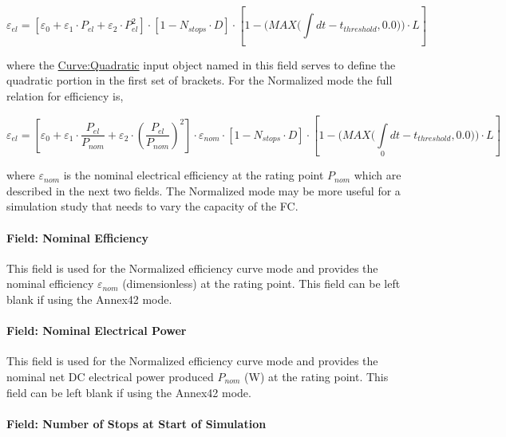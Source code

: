\begin{equation}
{\varepsilon_{el}} = \left[ {{\varepsilon_0} + {\varepsilon_1} \cdot {P_{el}} + {\varepsilon_2} \cdot P_{el}^2} \right] \cdot \left[ {1 - {N_{stops}} \cdot D} \right] \cdot \left[ {1 - (MAX(\int\limits_{} {dt - {t_{threshold}},0.0))}  \cdot L} \right]
\end{equation}

where the \hyperref[curvequadratic]{Curve:Quadratic} input object named in this field serves to define the quadratic portion in the first set of brackets. For the Normalized mode the full relation for efficiency is,

\begin{equation}
{\varepsilon_{el}} = \left[ {{\varepsilon_0} + {\varepsilon_1} \cdot \frac{{{P_{el}}}}{{{P_{nom}}}} + {\varepsilon_2} \cdot {{\left( {\frac{{{P_{el}}}}{{{P_{nom}}}}} \right)}^2}} \right] \cdot {\varepsilon_{nom}} \cdot \left[ {1 - {N_{stops}} \cdot D} \right] \cdot \left[ {1 - (MAX(\int\limits_0 {dt - {t_{threshold}},0.0))}  \cdot L} \right]
\end{equation}

where \({\varepsilon_{nom}}\) is the nominal electrical efficiency at the rating point \({P_{nom}}\) which are described in the next two fields. The Normalized mode may be more useful for a simulation study that needs to vary the capacity of the FC.

\paragraph{Field: Nominal Efficiency}\label{field-nominal-efficiency}

This field is used for the Normalized efficiency curve mode and provides the nominal efficiency \({\varepsilon_{nom}}\) (dimensionless) at the rating point. This field can be left blank if using the Annex42 mode.

\paragraph{Field: Nominal Electrical Power}\label{field-nominal-electrical-power}

This field is used for the Normalized efficiency curve mode and provides the nominal net DC electrical power produced \({P_{nom}}\) (W) at the rating point. This field can be left blank if using the Annex42 mode.

\paragraph{Field: Number of Stops at Start of Simulation}\label{field-number-of-stops-at-start-of-simulation}


